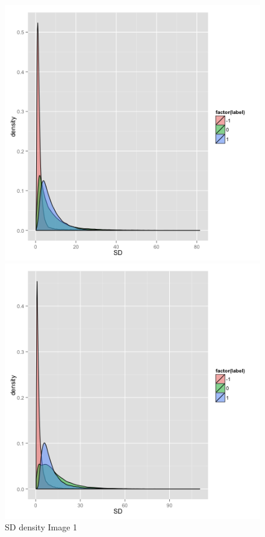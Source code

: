\documentclass{article}\usepackage[]{graphicx}\usepackage[]{color}
\begin{document}
\begin{figure}[h]
  \includegraphics[width=\linewidth]{SD1.png}
  \caption{SD density Image 1}\label{}
\endminipage\hfill
{}
  \includegraphics[width=\linewidth]{SD2.png}

\end{figure}
\end{document}
